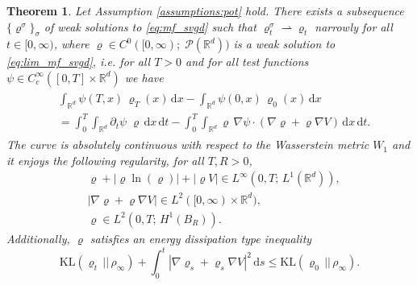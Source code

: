 \documentclass[reqno, 11pt]{amsart}
\numberwithin{equation}{section}
\newtheorem{thm}{Theorem}[section]
\theoremstyle{definition}
\begin{document}
\begin{thm}
    \label{thm:ex_weak_sol_nonloc_pde}
    Let Assumption \ref{assumptions:pot} hold. There exists a subsequence $\{\varrho^\sigma\}_\sigma$ of weak solutions to \eqref{eq:mf_svgd} such that $\varrho^\sigma_t\rightharpoonup \varrho_t$ narrowly for all $t \in [0,\infty)$, where $\varrho\in C^0([0,\infty);\;\mathscr{P}(\mathbb{R}^{d}))$ is a weak solution to \eqref{eq:lim_mf_svgd}, i.e. for all $T>0$ and for all test functions $\psi\in C_c^\infty([0,T]\times \mathbb{R}^{d})$ we have
    \begin{align}
        \label{eq:weak_sol_loc_pde}
        \begin{split}
            &\int_{\mathbb{R}^{d}}\psi(T,x)\, \varrho_T(x) \,\mathrm{d} x- \int_{\mathbb{R}^{d}}\psi(0,x)\, \varrho_0(x) \,\mathrm{d} x\\
            &=
            \int_0^T \int_{\mathbb{R}^{d}}\partial_t\psi\; \varrho \,\mathrm{d} x\,\mathrm{d} t-\int_0^T\int_{\mathbb{R}^{d}} \varrho\, \nabla \psi\cdot (\nabla \varrho+\varrho \nabla V) \,\mathrm{d} x\,\mathrm{d} t.
        \end{split}
    \end{align}
    The curve is absolutely continuous with respect to the Wasserstein metric $W_1$ and it enjoys the following regularity, for all $T,R>0$,
    \begin{align}
        \label{eq:regularity_weak_sol}
        &\varrho+|\varrho\ln(\varrho)|+|\varrho V|\in L^\infty(0,T;\, L^1(\mathbb{R}^{d})),\\
        \label{eq:regularity_weak_sol_2}
        &|\nabla\varrho+\varrho\nabla V|\in L^2([0,\infty)\times \mathbb{R}^{d}),\\
        \label{eq:regularity_weak_sol_3}
        &\varrho\in L^2(0,T;\, H^1(B_R)).
    \end{align}
    Additionally, $\varrho$ satisfies an energy dissipation type inequality
    \begin{equation}\label{eq:lim_edi}
        \mathrm{KL}(\varrho_t\,||\,\rho_\infty) + \int_0^t |\nabla \varrho_s +\varrho_s\nabla V|^2\,\mathrm{d} s \leq \mathrm{KL}(\varrho_0\,||\,\rho_\infty).
    \end{equation}
\end{thm}

\end{document}

